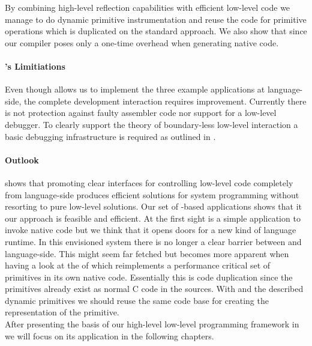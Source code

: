 By combining high-level reflection capabilities with efficient low-level code we manage to do dynamic primitive instrumentation and reuse the code for primitive operations which is duplicated on the standard \JIT approach.
We also show that since our \JIT compiler poses only a one-time overhead when generating native code. 

\paragraph{\B's Limitiations}
Even though \B allows us to implement the three example applications at language-side, the complete development interaction requires improvement.
Currently there is not protection against faulty assembler code nor support for a low-level debugger.
To clearly support the theory of boundary-less low-level interaction a basic debugging infrastructure is required as outlined in .

\paragraph{\B Outlook}
\B shows that promoting clear interfaces for controlling low-level code completely from language-side produces efficient solutions for system programming without resorting to pure low-level solutions.
Our set of \B-based applications shows that it our approach is feasible and efficient.
At the first sight \B is a simple application to invoke native code but we think that it opens doors for a new kind of language runtime.
In this envisioned system there is no longer a clear barrier between \VM and language-side.
This might seem far fetched but becomes more apparent when having a look at the \JIT of \PH which reimplements a performance critical set of primitives in its own native code.
Essentially this is code duplication since the primitives already exist as normal C code in the \VM sources.
With \B and the described dynamic primitives we should reuse the same code base for creating the \JIT representation of the primitive.\\

\noindent After presenting the basis of our high-level low-level programming framework in \PH we will focus on its application in the following chapters.


